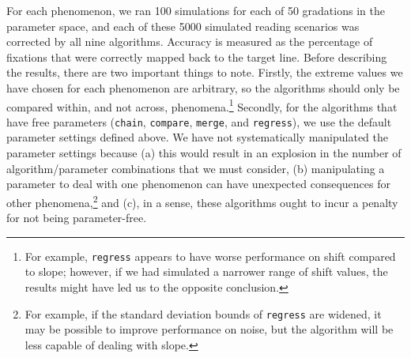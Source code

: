 \documentclass[doc,biblatex]{apa7}
\begin{document}
For each phenomenon, we ran 100 simulations for each of 50 gradations in the parameter space, and each of these 5000 simulated reading scenarios was corrected by all nine algorithms. Accuracy is measured as the percentage of fixations that were correctly mapped back to the target line. Before describing the results, there are two important things to note. Firstly, the extreme values we have chosen for each phenomenon are arbitrary, so the algorithms should only be compared within, and not across, phenomena.\footnote{For example, \texttt{regress} appears to have worse performance on shift compared to slope; however, if we had simulated a narrower range of shift values, the results might have led us to the opposite conclusion.} Secondly, for the algorithms that have free parameters (\texttt{chain}, \texttt{compare}, \texttt{merge}, and \texttt{regress}), we use the default parameter settings defined above. We have not systematically manipulated the parameter settings because (a) this would result in an explosion in the number of algorithm/parameter combinations that we must consider, (b) manipulating a parameter to deal with one phenomenon can have unexpected consequences for other phenomena,\footnote{For example, if the standard deviation bounds of \texttt{regress} are widened, it may be possible to improve performance on noise, but the algorithm will be less capable of dealing with slope.} and (c), in a sense, these algorithms ought to incur a penalty for not being parameter-free.
\end{document}
